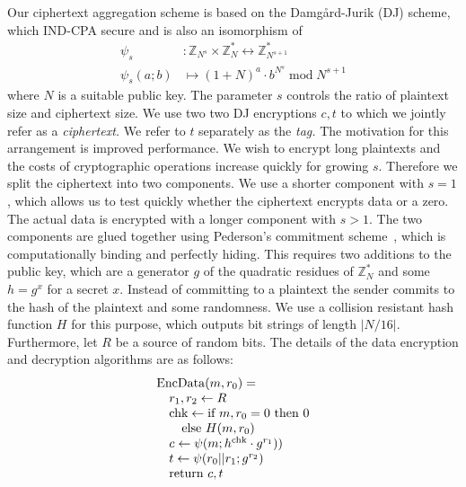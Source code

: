 \documentclass[twocolumn,10pt]{article}
\DeclareMathOperator{\EncData}{EncData}
\DeclareMathOperator{\imod}{mod}
\newcommand{\Zm}[1][N]{\mathbb{Z}^{\ast}_#1}
\newcommand{\Za}[1][N^s]{\mathbb{Z}_{#1}}
\newcommand{\Zn}[1][N^{s+1}]{\mathbb{Z}^{\ast}_{#1}}
\begin{document}
Our ciphertext aggregation scheme is based on the Damg\aa{}rd-Jurik (DJ)
scheme, which IND-CPA secure and is also an isomorphism of
\begin{align*}
  \psi_s &: \Za \times \Zm \leftrightarrow \Zn \\
  \psi_s(a;b) &\mapsto (1+N)^{a}\cdot b^{N^s} \imod N^{s+1}
\end{align*}
where $N$ is a suitable public key.  The parameter $s$ controls the ratio of
plaintext size and ciphertext size.  We use two two DJ encryptions $c,t$ to
which we jointly refer as a \emph{ciphertext.}  We refer to $t$ separately
as the \emph{tag.}  The motivation for this arrangement is improved
performance.  We wish to encrypt long plaintexts and the costs of
cryptographic operations increase quickly for growing $s$.  Therefore we
split the ciphertext into two components.  We use a shorter component with
$s=1$, which allows us to test quickly whether the ciphertext encrypts data
or a zero.  The actual data is encrypted with a longer component with $s>1$.
The two components are glued together using Pederson's commitment
scheme~\cite{Pederson1991}, which is computationally binding and perfectly
hiding.  This requires two additions to the public key, which are a
generator $g$ of the quadratic residues of $\Zm$ and some $h=g^x$ for a
secret $x$.  Instead of committing to a plaintext the sender commits to the
hash of the plaintext and some randomness.  We use a collision resistant
hash function $H$ for this purpose, which outputs bit strings of length
$|N/16|$.  Furthermore, let $R$ be a source of random bits.  The details of
the data encryption and decryption algorithms are as follows:
\begin{displaymath}
  \begin{array}[t]{l}
    \EncData(m, r_0) = \\
    \quad r_1, r_2 \leftarrow R \\
    \quad \text{chk} \leftarrow \text{if}~m,r_0=0 ~\text{then}~ 0 \\
    \qquad \text{else}~ H(m, r_0) \\
    \quad c \leftarrow \psi(m; h^{\text{chk}}\cdot g^{r_1})) \\
    \quad t \leftarrow \psi(r_0 || r_1;g^{r_2}) \\
    \quad \text{return} ~ c, t
  \end{array}
\end{displaymath}
\end{document}
